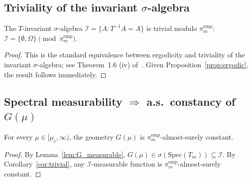 \subsection{Triviality of the invariant $\sigma$-algebra}
\label{ssec:trivial_inv}

\begin{corollary}
\label{cor:trivial}
The $T$-invariant $\sigma$-algebra
$\mathcal{I} = \{A : T^{-1}A = A\}$ is trivial modulo
$\pi_m^{\mathrm{emp}}$:
$\mathcal{I} = \{\emptyset, \Omega\} \pmod{\pi_m^{\mathrm{emp}}}$.
\end{corollary}

\begin{proof}
This is the standard equivalence between ergodicity and triviality
of the invariant $\sigma$-algebra; see Theorem~1.6 (iv)
of~\cite{Walters1982}. Given Proposition~\ref{prop:ergodic}, the
result follows immediately.
\end{proof}

\subsection{Spectral measurability $\Rightarrow$ a.s.\ constancy
of $G(\mu)$}
\label{ssec:G_as_constant}

\begin{corollary}
\label{cor:G_constant}
For every $\mu \in [\mu_c, \infty)$, the geometry $G(\mu)$ is
$\pi_m^{\mathrm{emp}}$-almost-surely constant.
\end{corollary}

\begin{proof}
By Lemma~\ref{lem:G_measurable}, $G(\mu) \in
\sigma(\mathrm{Spec}(T_m)) \subseteq \mathcal{I}$. By
Corollary~\ref{cor:trivial}, any $\mathcal{I}$-measurable function
is $\pi_m^{\mathrm{emp}}$-almost-surely constant.
\end{proof}

